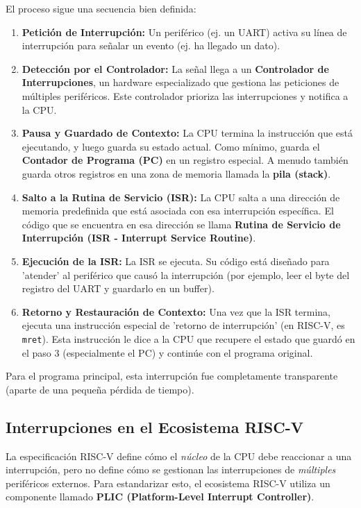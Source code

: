 \documentclass[12pt,a4paper]{article}
\begin{document}
El proceso sigue una secuencia bien definida:
\begin{enumerate}
    \item \textbf{Petición de Interrupción:} Un periférico (ej. un UART) activa su línea de interrupción para señalar un evento (ej. ha llegado un dato).
    \item \textbf{Detección por el Controlador:} La señal llega a un \textbf{Controlador de Interrupciones}, un hardware especializado que gestiona las peticiones de múltiples periféricos. Este controlador prioriza las interrupciones y notifica a la CPU.
    \item \textbf{Pausa y Guardado de Contexto:} La CPU termina la instrucción que está ejecutando, y luego guarda su estado actual. Como mínimo, guarda el \textbf{Contador de Programa (PC)} en un registro especial. A menudo también guarda otros registros en una zona de memoria llamada la \textbf{pila (stack)}.
    \item \textbf{Salto a la Rutina de Servicio (ISR):} La CPU salta a una dirección de memoria predefinida que está asociada con esa interrupción específica. El código que se encuentra en esa dirección se llama \textbf{Rutina de Servicio de Interrupción (ISR - Interrupt Service Routine)}.
    \item \textbf{Ejecución de la ISR:} La ISR se ejecuta. Su código está diseñado para 'atender' al periférico que causó la interrupción (por ejemplo, leer el byte del registro del UART y guardarlo en un buffer).
    \item \textbf{Retorno y Restauración de Contexto:} Una vez que la ISR termina, ejecuta una instrucción especial de 'retorno de interrupción' (en RISC-V, es \texttt{mret}). Esta instrucción le dice a la CPU que recupere el estado que guardó en el paso 3 (especialmente el PC) y continúe con el programa original.
\end{enumerate}

Para el programa principal, esta interrupción fue completamente transparente (aparte de una pequeña pérdida de tiempo).

\subsection{Interrupciones en el Ecosistema RISC-V}

La especificación RISC-V define cómo el \textit{núcleo} de la CPU debe reaccionar a una interrupción, pero no define cómo se gestionan las interrupciones de \textit{múltiples} periféricos externos. Para estandarizar esto, el ecosistema RISC-V utiliza un componente llamado \textbf{PLIC (Platform-Level Interrupt Controller)}.
\end{document}
